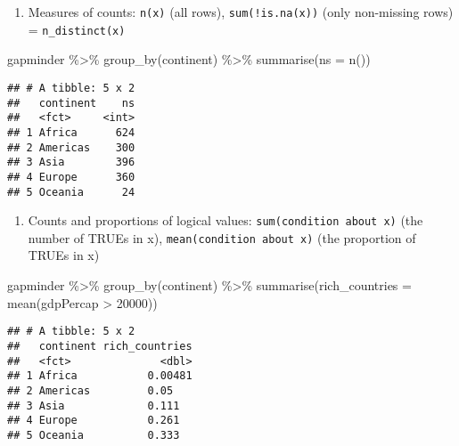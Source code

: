 \documentclass[
]{book}
\newenvironment{Shaded}{\begin{snugshade}}{\end{snugshade}}
\newcommand{\AttributeTok}[1]{\textcolor[rgb]{0.77,0.63,0.00}{#1}}
\newcommand{\DecValTok}[1]{\textcolor[rgb]{0.00,0.00,0.81}{#1}}
\newcommand{\FunctionTok}[1]{\textcolor[rgb]{0.00,0.00,0.00}{#1}}
\newcommand{\NormalTok}[1]{#1}
\newcommand{\SpecialCharTok}[1]{\textcolor[rgb]{0.00,0.00,0.00}{#1}}
\providecommand{\tightlist}{%
  \setlength{\itemsep}{0pt}\setlength{\parskip}{0pt}}
\begin{document}
\begin{enumerate}
\def\labelenumi{\arabic{enumi}.}
\setcounter{enumi}{3}
\tightlist
\item
  Measures of counts: \texttt{n(x)} (all rows), \texttt{sum(!is.na(x))} (only non-missing rows) = \texttt{n\_distinct(x)}
\end{enumerate}

\begin{Shaded}
\begin{Highlighting}[]
\NormalTok{gapminder }\SpecialCharTok{\%\textgreater{}\%}
  \FunctionTok{group\_by}\NormalTok{(continent) }\SpecialCharTok{\%\textgreater{}\%}
  \FunctionTok{summarise}\NormalTok{(}\AttributeTok{ns =} \FunctionTok{n}\NormalTok{())}
\end{Highlighting}
\end{Shaded}

\begin{verbatim}
## # A tibble: 5 x 2
##   continent    ns
##   <fct>     <int>
## 1 Africa      624
## 2 Americas    300
## 3 Asia        396
## 4 Europe      360
## 5 Oceania      24
\end{verbatim}

\begin{enumerate}
\def\labelenumi{\arabic{enumi}.}
\setcounter{enumi}{4}
\tightlist
\item
  Counts and proportions of logical values: \texttt{sum(condition\ about\ x)} (the number of TRUEs in x), \texttt{mean(condition\ about\ x)} (the proportion of TRUEs in x)
\end{enumerate}

\begin{Shaded}
\begin{Highlighting}[]
\NormalTok{gapminder }\SpecialCharTok{\%\textgreater{}\%}
  \FunctionTok{group\_by}\NormalTok{(continent) }\SpecialCharTok{\%\textgreater{}\%}
  \FunctionTok{summarise}\NormalTok{(}\AttributeTok{rich\_countries =} \FunctionTok{mean}\NormalTok{(gdpPercap }\SpecialCharTok{\textgreater{}} \DecValTok{20000}\NormalTok{))}
\end{Highlighting}
\end{Shaded}

\begin{verbatim}
## # A tibble: 5 x 2
##   continent rich_countries
##   <fct>              <dbl>
## 1 Africa           0.00481
## 2 Americas         0.05   
## 3 Asia             0.111  
## 4 Europe           0.261  
## 5 Oceania          0.333
\end{verbatim}
\end{document}
